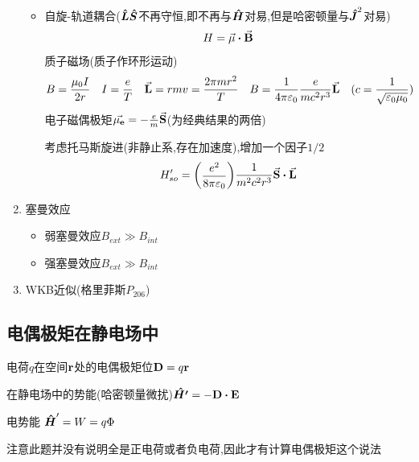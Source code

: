\documentclass{article}
\begin{document}
\begin{formal}
\begin{enumerate}
\begin{itemize}
                        \item 自旋-轨道耦合($\vu*{L}\vu*{S}$不再守恒,即不再与$\vu*{H}$对易,但是哈密顿量与$\vu*{J}^{2}$对易)
                        $$ H = \va{\mu} \vdot \va{B} $$
                        质子磁场(质子作环形运动)
                        $$ 
                        B = \frac{\mu_{0}I}{2r} \quad I = \frac{e}{T} \quad \va{L} = rmv = \frac{2\pi mr^{2}}{T} \quad 
                        B = \frac{1}{4\pi \varepsilon_{0}} \frac{e}{mc^{2}r^{3}}\va{L} \quad (c = \frac{1}{\sqrt{\varepsilon_{0} \mu_{0}}})
                        $$
                        电子磁偶极矩$ \va{\mu_{e}} = -\frac{e}{m} \va{S} $(为经典结果的两倍)

                        考虑托马斯旋进(非静止系,存在加速度),增加一个因子$1/2$
                        $$ H_{so}' = \mqty(\dfrac{e^{2}}{8\pi \varepsilon_{0}}) \frac{1}{m^{2}c^{2}r^{3}} \va{S} \vdot \va{L} $$
                        
                    \end{itemize}  

                \item 塞曼效应
                    \begin{itemize}
                        \item 弱塞曼效应$ B_{ext}  \gg B_{int}$
                        \item 强塞曼效应$ B_{ext}  \gg B_{int}$
                    \end{itemize}
                
                \item WKB近似(格里菲斯$P_{206}$) 

            \end{enumerate}
        \end{formal}

        \subsection{电偶极矩在静电场中}
            \begin{formal}
                电荷$q$在空间$\vb{r}$处的电偶极矩位$\vb{D} = q \vb{r}$

                在静电场中的势能(哈密顿量微扰)$ \vu*{H'} = - \vb{D} \vdot \vb{E} $

                电势能 $ \vu*{H}' = W = q \Phi  $
            \end{formal}

            注意此题并没有说明全是正电荷或者负电荷,因此才有计算电偶极矩这个说法
\end{document}
